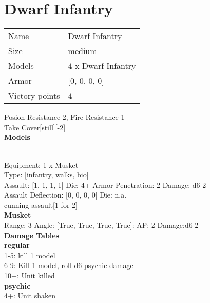 \pagebreak\pagebreak

\section{ Dwarf Infantry }

\begin{tabular}{ll}
  Name & Dwarf Infantry \\
  Size & medium\\
  Models & 4 x Dwarf Infantry\\
  Armor & [0, 0, 0, 0]\\
  Victory points & 4\\
\end{tabular}

Posion Resistance 2, Fire Resistance 1\\ 
Take Cover[still][-2]\\ 


{\bf Models}

 \\
Equipment: 1 x Musket \\
Type: [infantry, walks, bio] \\

Assault: [1, 1, 1, 1] Die: 4+ Armor Penetration: 2 Damage: d6-2 \\
Assault Deflection: [0, 0, 0, 0] Die: n.a.\\
\indent cunning assault[1 for 2]\\ 
 



{\bf Musket } \\



Range: 3  Angle: [True, True, True, True]: AP: 2 Damage:d6-2 \\




 





{\bf Damage Tables} \\
 {\bf regular } \\
1-5: kill 1 model \\
6-9: Kill 1 model, roll d6 psychic damage \\
10+: Unit killed \\
 {\bf psychic } \\
4+: Unit shaken \\










\pagebreak